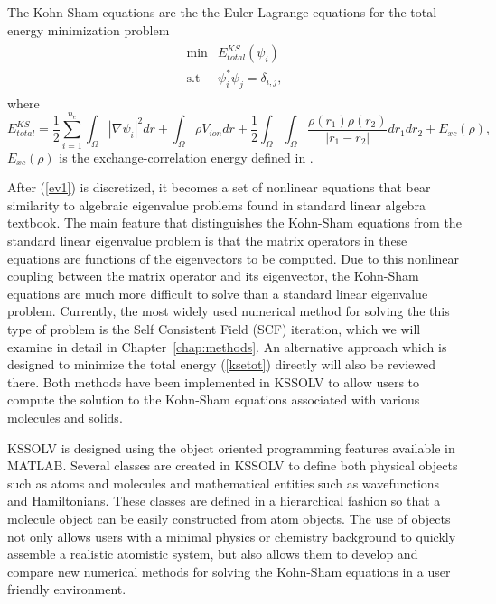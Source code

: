 \documentclass[11pt]{book}
\begin{document}
The Kohn-Sham equations are the the Euler-Lagrange equations for
the total energy minimization problem
\begin{eqnarray}
\begin{array}{cc}
\min       & E_{total}^{KS}(\psi_i) \\
\mbox{s.t} & \psi_i^{\ast}\psi_j = \delta_{i,j},
\end{array} \label{ksmin}
\end{eqnarray}
where
\begin{equation}
E_{total}^{KS} = \frac{1}{2}\sum_{i=1}^{n_e} \int_{\Omega} 
|\nabla \psi_i|^2 dr + \int_{\Omega}\rho  V_{ion} dr
+\frac{1}{2}\int_{\Omega} \int_{\Omega} \frac{\rho(r_1)\rho(r_2)}{|r_1 - r_2|}
dr_1 dr_2 + E_{xc}(\rho),
\label{ksetot}
\end{equation}
$E_{xc}(\rho)$ is the exchange-correlation energy defined in \cite{kohnsham}. 

After (\ref{ev1}) is discretized, it becomes a set of nonlinear equations 
that bear similarity to algebraic eigenvalue problems found in standard linear 
algebra textbook. The main feature that distinguishes the Kohn-Sham equations
from the standard linear eigenvalue problem is that the matrix operators 
in these equations are functions of the eigenvectors to be computed.  
Due to this nonlinear coupling between the matrix operator and
its eigenvector, the Kohn-Sham equations are much more difficult to
solve than a standard linear eigenvalue problem.  
Currently, the most widely used numerical method for solving the 
this type of problem is the Self Consistent Field (SCF) iteration, 
which we will examine in detail in Chapter~\ref{chap:methods}. 
An alternative approach which is designed to minimize the 
total energy (\ref{ksetot}) directly will also be reviewed there.
Both methods have been implemented in KSSOLV to allow users to 
compute the solution to the Kohn-Sham equations associated with various
molecules and solids.

KSSOLV is designed using the object oriented programming features
available in MATLAB.  Several classes are created in KSSOLV to 
define both physical objects such as atoms and molecules and 
mathematical entities such as wavefunctions and Hamiltonians.
These classes are defined in a hierarchical fashion so that
a molecule object can be easily constructed from atom objects.
The use of objects not only allows users with a minimal physics or 
chemistry background to quickly assemble a realistic atomistic
system, but also allows them to develop and compare new numerical 
methods for solving the Kohn-Sham equations in a user friendly
environment. 
\end{document}

